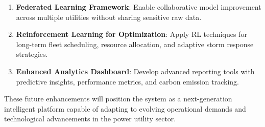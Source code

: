 \begin{enumerate}
    \item \textbf{Federated Learning Framework}: Enable collaborative model improvement across multiple utilities without sharing sensitive raw data.
    
    \item \textbf{Reinforcement Learning for Optimization}: Apply RL techniques for long-term fleet scheduling, resource allocation, and adaptive storm response strategies.
    
    \item \textbf{Enhanced Analytics Dashboard}: Develop advanced reporting tools with predictive insights, performance metrics, and carbon emission tracking.
\end{enumerate}

These future enhancements will position the system as a next-generation intelligent platform capable of adapting to evolving operational demands and technological advancements in the power utility sector.